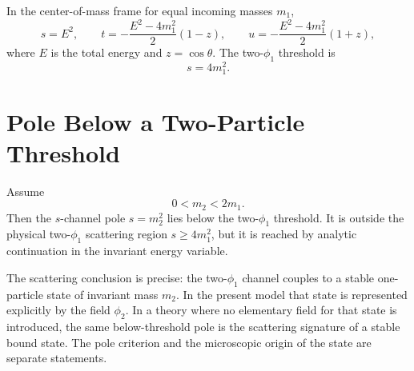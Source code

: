 In the center-of-mass frame for equal incoming masses \(m_1\),
\[
  s=E^2,
  \qquad
  t=-\frac{E^2-4m_1^2}{2}(1-z),
  \qquad
  u=-\frac{E^2-4m_1^2}{2}(1+z),
\]
where \(E\) is the total energy and \(z=\cos\theta\). The two-\(\phi_1\)
threshold is
\[
  s=4m_1^2 .
\]

\section{Pole Below a Two-Particle Threshold}

Assume
\[
  0<m_2<2m_1 .
\]
Then the \(s\)-channel pole \(s=m_2^2\) lies below the two-\(\phi_1\)
threshold. It is outside the physical two-\(\phi_1\) scattering region
\(s\ge4m_1^2\), but it is reached by analytic continuation in the invariant
energy variable.

\begin{center}
\end{center}

The scattering conclusion is precise: the two-\(\phi_1\) channel couples to a
stable one-particle state of invariant mass \(m_2\). In the present model that
state is represented explicitly by the field \(\phi_2\). In a theory where no
elementary field for that state is introduced, the same below-threshold pole
is the scattering signature of a stable bound state. The pole criterion and
the microscopic origin of the state are separate statements.

